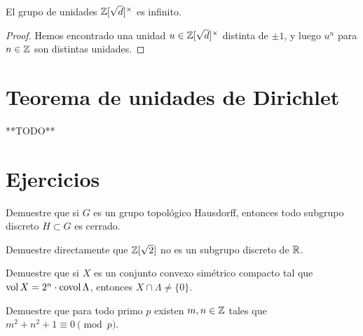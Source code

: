\begin{corolario}
  El grupo de unidades $\mathbb{Z} [\sqrt{d}]^\times$ es infinito.

  \begin{proof}
    Hemos encontrado una unidad $u \in \mathbb{Z} [\sqrt{d}]^\times$ distinta de
    $\pm 1$, y luego $u^n$ para $n \in \mathbb{Z}$ son distintas unidades.
  \end{proof}
\end{corolario}


\section{Teorema de unidades de Dirichlet}

**TODO**

\fi

\pagebreak


\section*{Ejercicios}

\begin{ejercicio}
  Demuestre que si $G$ es un grupo topológico Hausdorff, entonces todo subgrupo
  discreto $H \subset G$ es cerrado.
\end{ejercicio}

\begin{ejercicio}
  Demuestre directamente que $\mathbb{Z} [\sqrt{2}]$ no es un subgrupo discreto de
  $\mathbb{R}$.
\end{ejercicio}

\begin{ejercicio}
  Demuestre que si $X$ es un conjunto convexo simétrico compacto tal que
  $\operatorname{vol} X = 2^n\cdot \operatorname{covol} \Lambda$, entonces $X \cap \Lambda \ne \{ 0 \}$.
\end{ejercicio}

\begin{ejercicio}
  Demuestre que para todo primo $p$ existen $m,n \in \mathbb{Z}$ tales que
  $m^2 + n^2 + 1 \equiv 0 \pmod{p}$.
\end{ejercicio}
